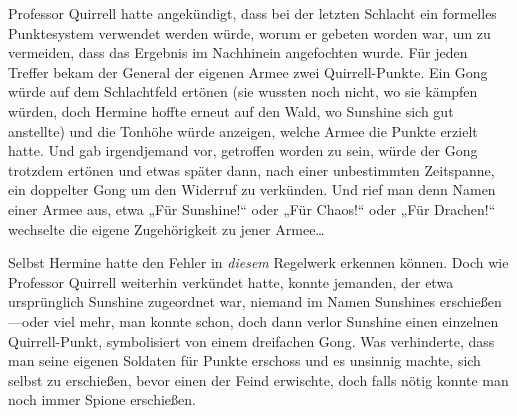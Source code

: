 Professor Quirrell hatte angekündigt, dass bei der letzten Schlacht ein formelles Punktesystem verwendet werden würde, worum er gebeten worden war, um zu vermeiden, dass das Ergebnis im Nachhinein angefochten wurde. Für jeden Treffer bekam der General der eigenen Armee zwei Quirrell-Punkte. Ein Gong würde auf dem Schlachtfeld ertönen (sie wussten noch nicht, wo sie kämpfen würden, doch Hermine hoffte erneut auf den Wald, wo Sunshine sich gut anstellte) und die Tonhöhe würde anzeigen, welche Armee die Punkte erzielt hatte. Und gab irgendjemand vor, getroffen worden zu sein, würde der Gong trotzdem ertönen und etwas später dann, nach einer unbestimmten Zeitspanne, ein doppelter Gong um den Widerruf zu verkünden. Und rief man denn Namen einer Armee aus, etwa „Für Sunshine!“ oder „Für Chaos!“ oder „Für Drachen!“ wechselte die eigene Zugehörigkeit zu jener Armee…

Selbst Hermine hatte den Fehler in \emph{diesem} Regelwerk erkennen können. Doch wie Professor Quirrell weiterhin verkündet hatte, konnte jemanden, der etwa ursprünglich Sunshine zugeordnet war, niemand im Namen Sunshines erschießen—oder viel mehr, man konnte schon, doch dann verlor Sunshine einen einzelnen Quirrell-Punkt, symbolisiert von einem dreifachen Gong. Was verhinderte, dass man seine eigenen Soldaten für Punkte erschoss und es unsinnig machte, sich selbst zu erschießen, bevor einen der Feind erwischte, doch falls nötig konnte man noch immer Spione erschießen.

